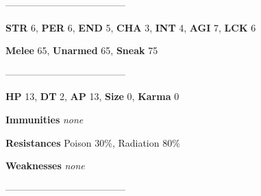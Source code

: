 \documentclass[11pt,a4paper,twocolumn]{book}
\begin{document}
%		
%	
%		

	--------------------------------------

	\noindent
	\textbf{STR} 6, \textbf{PER} 6, \textbf{END} 5, \textbf{CHA} 3, \textbf{INT} 4, \textbf{AGI} 7, \textbf{LCK} 6
	
	\noindent
	\textbf{Melee} 65, \textbf{Unarmed} 65, \textbf{Sneak} 75
	
	--------------------------------------
	
	\noindent
	\textbf{HP} 13, \textbf{DT} 2, \textbf{AP} 13, \textbf{Size} 0, \textbf{Karma} 0
	
	
	\noindent
	\textbf{Immunities} \emph{none} %
	
	\noindent
	\textbf{Resistances} Poison 30\%, Radiation 80\%%
	
	\noindent
	\textbf{Weaknesses} \emph{none} %
	
	--------------------------------------
	
\end{document}
